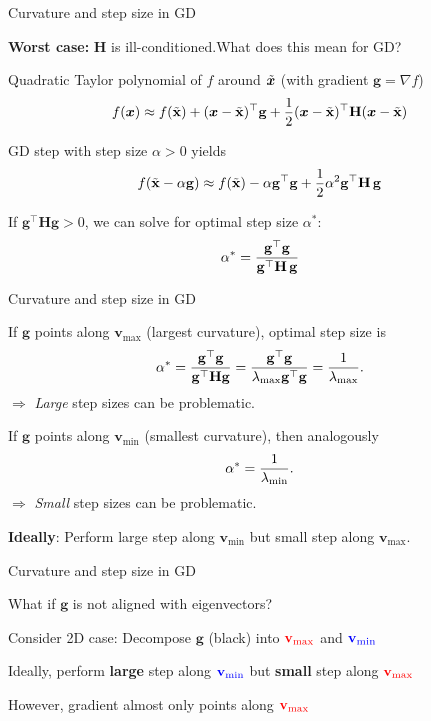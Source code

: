 \documentclass[11pt,compress,t,notes=noshow, xcolor=table]{beamer}
\begin{document}
\begin{framei}{Curvature and step size in GD}
\item\textbf{Worst case:} $\mathbf{H}$ is ill-conditioned.What does this mean for GD?
\vfill
\begin{itemizeM}
\item Quadratic Taylor polynomial of $f$ around $\tilde{\bm{x}}$ (with gradient $\mathbf{g} = \nabla f$)
$$f(\bm{x}) \approx f(\tilde{\mathbf{x}}) + (\bm{x} - \tilde{\mathbf{x}})^\top \mathbf{g} + \frac{1}{2} (\bm{x} - \tilde{\mathbf{x}})^\top \mathbf{H} (\bm{x} - \tilde{\mathbf{x}})$$
\item GD step with step size $\alpha > 0$ yields
$$f(\tilde{\mathbf{x}}-\alpha \mathbf{g}) \approx f(\tilde{\mathbf{x}}) - \alpha \mathbf{g}^\top\mathbf{g} + \frac{1}{2} \alpha^2 \mathbf{g}^\top \mathbf{H}\,\mathbf{g}$$
\item If $\mathbf{g}^\top \bm{H} \mathbf{g} > 0$, we can solve for optimal step size $\alpha^\ast$:
$$\alpha^\ast = \frac{\mathbf{g}^\top \mathbf{g}}{\mathbf{g}^\top \mathbf{H}\, \mathbf{g}}$$
\end{itemizeM}
\end{framei}


\begin{framei}{Curvature and step size in GD}
\item If $\mathbf{g}$ points along $\mathbf{v}_{\text{max}}$ (largest curvature), optimal step size is
$$\alpha^\ast = \frac{\mathbf{g}^\top \mathbf{g}}{\mathbf{g}^\top \mathbf{H} \mathbf{g}} = \frac{\mathbf{g}^\top \mathbf{g}}{\lambda_\text{max} \mathbf{g}^\top \mathbf{g}} = \frac{1}{\lambda_\text{max}}.$$
$\Rightarrow$ \textit{Large} step sizes can be problematic.
\item If $\mathbf{g}$ points along $\mathbf{v}_{\text{min}}$ (smallest curvature), then analogously
$$\alpha^* = \frac{1}{\lambda_\text{min}}.$$
$\Rightarrow$ \textit{Small} step sizes can be problematic.
\item \textbf{Ideally}: Perform large step along $\mathbf{v}_\text{min}$ but small step along $\mathbf{v}_\text{max}$.
\end{framei}


\begin{framei}{Curvature and step size in GD}
\item What if $\mathbf{g}$ is not aligned with eigenvectors?
\item Consider 2D case: Decompose $\mathbf{g}$ (black) into $\textcolor{red}{\mathbf{v}_{\text{max}}}$ and $\textcolor{blue}{\mathbf{v}_{\text{min}}}$
\item Ideally, perform \textbf{large} step along $\textcolor{blue}{\mathbf{v}_{\text{min}}}$ but \textbf{small} step along $\textcolor{red}{\mathbf{v}_{\text{max}}}$
\item However, gradient almost only points along $\textcolor{red}{\mathbf{v}_\text{max}}$
\end{framei}
\end{document}
